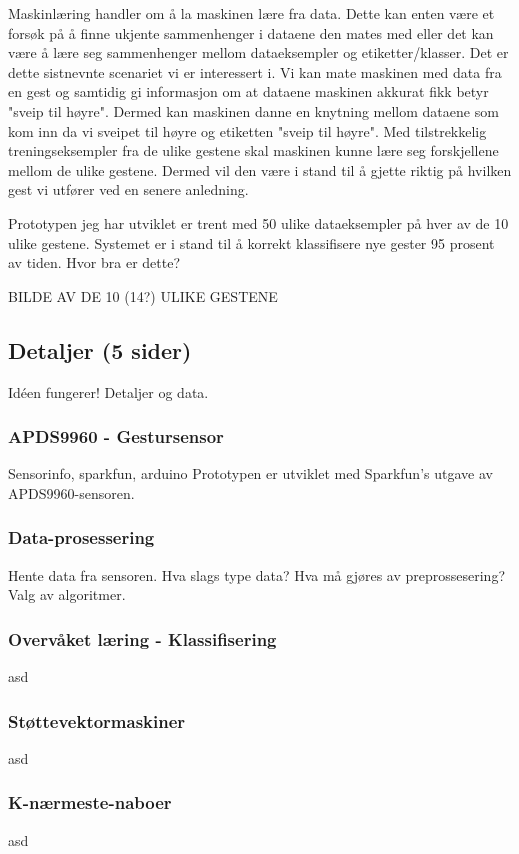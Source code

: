Maskinlæring handler om å la maskinen lære fra data. Dette kan enten være et forsøk på å finne ukjente sammenhenger i dataene den mates med eller det kan være å lære seg sammenhenger mellom dataeksempler og etiketter/klasser. Det er dette sistnevnte scenariet vi er interessert i. Vi kan mate maskinen med data fra en gest og samtidig gi informasjon om at dataene maskinen akkurat fikk betyr "sveip til høyre". Dermed kan maskinen danne en knytning mellom dataene som kom inn da vi sveipet til høyre og etiketten "sveip til høyre". Med tilstrekkelig treningseksempler fra de ulike gestene skal maskinen kunne lære seg forskjellene mellom de ulike gestene. Dermed vil den være i stand til å gjette riktig på hvilken gest vi utfører ved en senere anledning.

Prototypen jeg har utviklet er trent med 50 ulike dataeksempler på hver av de 10 ulike gestene. Systemet er i stand til å korrekt klassifisere nye gester 95 prosent av tiden. {\color{red} Hvor bra er dette?} 

{\color{red} BILDE AV DE 10 (14?) ULIKE GESTENE}


\subsection{Detaljer (5 sider)}
Idéen fungerer! Detaljer og data.

\subsubsection{APDS9960 - Gestursensor}
{\color{red} Sensorinfo, sparkfun, arduino} Prototypen er utviklet med Sparkfun's utgave av APDS9960-sensoren. 

\subsubsection{Data-prosessering}
Hente data fra sensoren. Hva slags type data? Hva må gjøres av preprossesering? Valg av algoritmer.

\subsubsection{Overvåket læring - Klassifisering}
asd

\subsubsection{Støttevektormaskiner}
asd

\subsubsection{K-nærmeste-naboer}
asd

